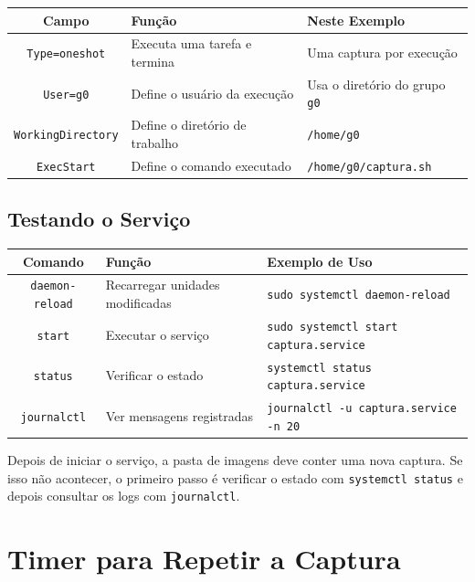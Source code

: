 \documentclass[12pt]{article}
\begin{document}
\begin{cmdbox}
\begin{tabularx}{\linewidth}{@{}C >{\raggedright\arraybackslash}X >{\raggedright\arraybackslash}X@{}}
\toprule
\textbf{Campo} & \textbf{Função} & \textbf{Neste Exemplo} \\
\midrule
\texttt{Type=oneshot} & Executa uma tarefa e termina & Uma captura por execução \\
\texttt{User=g0} & Define o usuário da execução & Usa o diretório do grupo \texttt{g0} \\
\texttt{WorkingDirectory} & Define o diretório de trabalho & \texttt{/home/g0} \\
\texttt{ExecStart} & Define o comando executado & \texttt{/home/g0/captura.sh} \\
\bottomrule
\end{tabularx}
\end{cmdbox}

\subsection{Testando o Serviço}

\begin{cmdbox}
\begin{tabularx}{\linewidth}{@{}C >{\raggedright\arraybackslash}X >{\raggedright\arraybackslash}X@{}}
\toprule
\textbf{Comando} & \textbf{Função} & \textbf{Exemplo de Uso} \\
\midrule
\texttt{daemon-reload} & Recarregar unidades modificadas & \texttt{sudo systemctl daemon-reload} \\
\texttt{start} & Executar o serviço & \texttt{sudo systemctl start captura.service} \\
\texttt{status} & Verificar o estado & \texttt{systemctl status captura.service} \\
\texttt{journalctl} & Ver mensagens registradas & \texttt{journalctl -u captura.service -n 20} \\
\bottomrule
\end{tabularx}
\end{cmdbox}

Depois de iniciar o serviço, a pasta de imagens deve conter uma nova captura. Se isso não acontecer, o primeiro passo é verificar o estado com \texttt{systemctl status} e depois consultar os logs com \texttt{journalctl}.

\section{Timer para Repetir a Captura}
\end{document}
